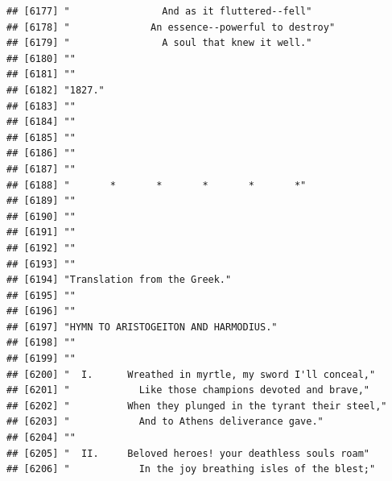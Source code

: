 \documentclass{article}\usepackage[]{graphicx}\usepackage[]{color}
\makeatletter
\newenvironment{kframe}{%
 \def\at@end@of@kframe{}%
 \ifinner\ifhmode%
  \def\at@end@of@kframe{\end{minipage}}%
  \begin{minipage}{\columnwidth}%
 \fi\fi%
 \def\FrameCommand##1{\hskip\@totalleftmargin \hskip-\fboxsep
 \colorbox{shadecolor}{##1}\hskip-\fboxsep
     \hskip-\linewidth \hskip-\@totalleftmargin \hskip\columnwidth}%
 \MakeFramed {\advance\hsize-\width
   \@totalleftmargin\z@ \linewidth\hsize
   \@setminipage}}%
 {\par\unskip\endMakeFramed%
 \at@end@of@kframe}
\newenvironment{knitrout}{}{} %
\makeatother
\begin{document}
\begin{knitrout}
\begin{kframe}
\begin{verbatim}
## [6177] "                And as it fluttered--fell"                                   
## [6178] "              An essence--powerful to destroy"                               
## [6179] "                A soul that knew it well."                                   
## [6180] ""                                                                            
## [6181] ""                                                                            
## [6182] "1827."                                                                       
## [6183] ""                                                                            
## [6184] ""                                                                            
## [6185] ""                                                                            
## [6186] ""                                                                            
## [6187] ""                                                                            
## [6188] "       *       *       *       *       *"                                    
## [6189] ""                                                                            
## [6190] ""                                                                            
## [6191] ""                                                                            
## [6192] ""                                                                            
## [6193] ""                                                                            
## [6194] "Translation from the Greek."                                                 
## [6195] ""                                                                            
## [6196] ""                                                                            
## [6197] "HYMN TO ARISTOGEITON AND HARMODIUS."                                         
## [6198] ""                                                                            
## [6199] ""                                                                            
## [6200] "  I.      Wreathed in myrtle, my sword I'll conceal,"                        
## [6201] "            Like those champions devoted and brave,"                         
## [6202] "          When they plunged in the tyrant their steel,"                      
## [6203] "            And to Athens deliverance gave."                                 
## [6204] ""                                                                            
## [6205] "  II.     Beloved heroes! your deathless souls roam"                         
## [6206] "            In the joy breathing isles of the blest;"                        

\end{verbatim}
\end{kframe}
\end{knitrout}
\end{document}

